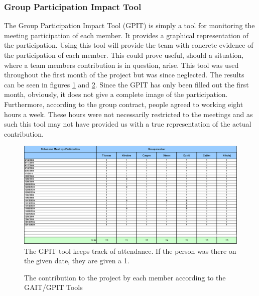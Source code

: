 \subsubsection{Group Participation Impact Tool}
The Group Participation Impact Tool (GPIT) is simply a tool for monitoring the meeting participation of each member. It provides a graphical representation of the participation. Using this tool will provide the team with concrete evidence of the participation of each member. This could prove useful, should a situation, where a team members contribution is in question, arise. This tool was used throughout the first month of the project but was since neglected. The results can be seen in figures \ref{fig:GPIT} and \ref{fig:GPITGraph}. Since the GPIT has only been filled out the first month, obviously, it does not give a complete image of the participation. Furthermore, according to the group contract, people agreed to working eight hours a week. These hours were not necessarily restricted to the meetings and as such this tool may not have provided us with a true representation of the actual contribution.


\begin{figure}[h!]
	\includegraphics[width=\textwidth]{./graphics/gpit_attendance}
	\caption[The GPIT tool]{The GPIT tool keeps track of attendance. If the person was there on the given date, they are given a 1.}
	\label{fig:GPIT}
\end{figure}

\begin{figure}[h!]
	\caption[The contribution by each member]{The contribution to the project by each member according to the GAIT/GPIT Tools}
	\label{fig:GPITGraph}
\end{figure}